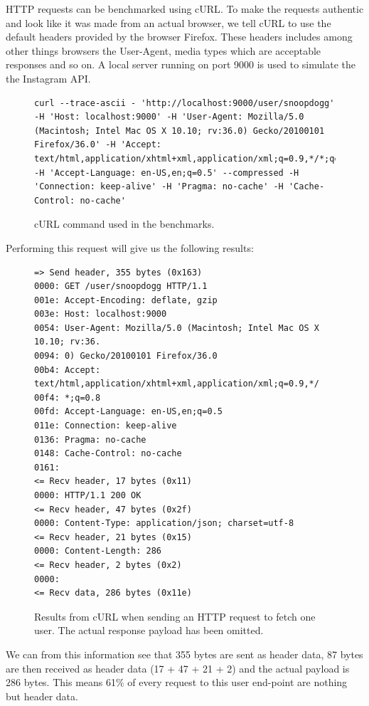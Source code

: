 \documentclass{cslthse-msc}
\begin{document}
HTTP requests can be benchmarked using cURL\cite{curl}. To make the requests authentic and look like it was made from an actual browser, we tell cURL to use the default headers provided by the browser Firefox. These headers includes among other things browsers the User-Agent, media types which are acceptable responses and so on. A local server running on port 9000 is used to simulate the the Instagram API.

\begin{figure}[H]
  \centering
\begin{lstlisting}[breaklines=true]
curl --trace-ascii - 'http://localhost:9000/user/snoopdogg' -H 'Host: localhost:9000' -H 'User-Agent: Mozilla/5.0 (Macintosh; Intel Mac OS X 10.10; rv:36.0) Gecko/20100101 Firefox/36.0' -H 'Accept: text/html,application/xhtml+xml,application/xml;q=0.9,*/*;q=0.8' -H 'Accept-Language: en-US,en;q=0.5' --compressed -H 'Connection: keep-alive' -H 'Pragma: no-cache' -H 'Cache-Control: no-cache'
\end{lstlisting}
  \caption{cURL command used in the benchmarks.}
\end{figure}

Performing this request will give us the following results:

\begin{figure}[H]
  \centering
\begin{lstlisting}[breaklines=true]
=> Send header, 355 bytes (0x163)
0000: GET /user/snoopdogg HTTP/1.1
001e: Accept-Encoding: deflate, gzip
003e: Host: localhost:9000
0054: User-Agent: Mozilla/5.0 (Macintosh; Intel Mac OS X 10.10; rv:36.
0094: 0) Gecko/20100101 Firefox/36.0
00b4: Accept: text/html,application/xhtml+xml,application/xml;q=0.9,*/
00f4: *;q=0.8
00fd: Accept-Language: en-US,en;q=0.5
011e: Connection: keep-alive
0136: Pragma: no-cache
0148: Cache-Control: no-cache
0161:
<= Recv header, 17 bytes (0x11)
0000: HTTP/1.1 200 OK
<= Recv header, 47 bytes (0x2f)
0000: Content-Type: application/json; charset=utf-8
<= Recv header, 21 bytes (0x15)
0000: Content-Length: 286
<= Recv header, 2 bytes (0x2)
0000:
<= Recv data, 286 bytes (0x11e)
\end{lstlisting}
  \caption{Results from cURL when sending an HTTP request to fetch one user. The actual response payload has been omitted.}
\end{figure}

We can from this information see that 355 bytes are sent as header data, 87 bytes are then received as header data (17 + 47 + 21 + 2) and the actual payload is 286 bytes. This means 61\% of every request to this user end-point are nothing but header data.
\end{document}
